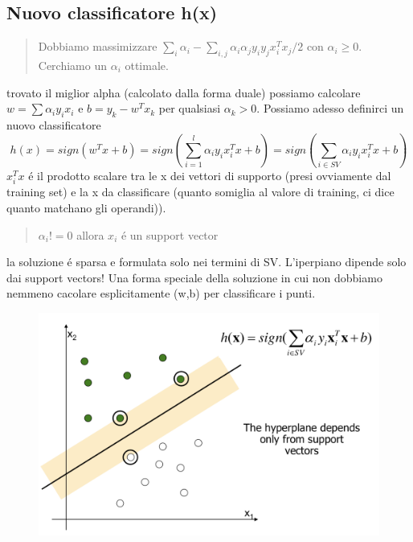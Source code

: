 \documentclass{article}
\begin{document}
\subsection{Nuovo classificatore h(x)}
\begin{quote}
    Dobbiamo massimizzare $\sum_i \alpha_i - \sum_{i,j} \alpha_i\alpha_j y_i y_j x_i^T x_j / 2$ con $\alpha_i \geq 0$. Cerchiamo un $\alpha_i$ ottimale.
\end{quote}
trovato il miglior alpha (calcolato dalla forma duale) possiamo calcolare $w=\sum \alpha_iy_ix_i$ e $b=y_k-w^Tx_k$ per qualsiasi $\alpha_k >0$. Possiamo adesso definirci un nuovo classificatore 
\begin{equation}
    h(x)=sign(w^Tx+b)=sign(\sum_{i=1}^l \alpha_iy_ix_i^Tx+b)=sign(\sum_{i \in SV} \alpha_iy_ix_i^T x+b)
\end{equation}
$x_i^Tx$ é il prodotto scalare tra le x dei vettori di supporto (presi ovviamente dal training set) e la x da classificare (quanto somiglia al valore di training, ci dice quanto matchano gli operandi)).
\begin{quote}
    $\alpha_i!=0$ allora $x_i$ é un support vector
\end{quote}
la soluzione é sparsa e formulata solo nei termini di SV. L'iperpiano dipende solo dai support vectors! Una forma speciale della soluzione in cui non dobbiamo nemmeno cacolare esplicitamente (w,b) per classificare i punti.
\begin{figure}[H]
\centering
\includegraphics[scale=0.4]{Images/hyperplanesv.png}
\end{figure}
\clearpage
\end{document}
